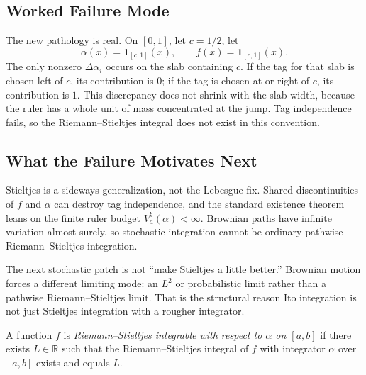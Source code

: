 \subsection*{Worked Failure Mode}

\begin{remark*}[Interpretation]
The new pathology is real. On \([0,1]\), let \(c=1/2\), let
\[
  \alpha(x)=\mathbf 1_{[c,1]}(x),
  \qquad
  f(x)=\mathbf 1_{[c,1]}(x).
\]
The only nonzero \(\Delta\alpha_i\) occurs on the slab containing \(c\). If the
tag for that slab is chosen left of \(c\), its contribution is \(0\); if the
tag is chosen at or right of \(c\), its contribution is \(1\). This discrepancy
does not shrink with the slab width, because the ruler has a whole unit of
mass concentrated at the jump. Tag independence fails, so the
Riemann--Stieltjes integral does not exist in this convention.
\end{remark*}

\subsection*{What the Failure Motivates Next}

\begin{remark*}[Interpretation]
Stieltjes is a sideways generalization, not the Lebesgue fix. Shared
discontinuities of \(f\) and \(\alpha\) can destroy tag independence, and the
standard existence theorem leans on the finite ruler budget
\(V_a^b(\alpha)<\infty\). Brownian paths have infinite variation almost surely,
so stochastic integration cannot be ordinary pathwise Riemann--Stieltjes
integration.
\end{remark*}

\begin{remark*}[Interpretation]
The next stochastic patch is not ``make Stieltjes a little better.'' Brownian
motion forces a different limiting mode: an \(L^2\) or probabilistic limit
rather than a pathwise Riemann--Stieltjes limit. That is the structural reason
Ito integration is not just Stieltjes integration with a rougher integrator.
\end{remark*}

\begin{definition}
\label{def:is-riemann-stieltjes-integrable}
A function $f$ is \emph{Riemann--Stieltjes integrable with respect to $\alpha$ on $[a,b]$} if there exists $L\in\mathbb R$ such that the Riemann--Stieltjes integral of $f$ with integrator $\alpha$ over $[a,b]$ exists and equals $L$.
\end{definition}

